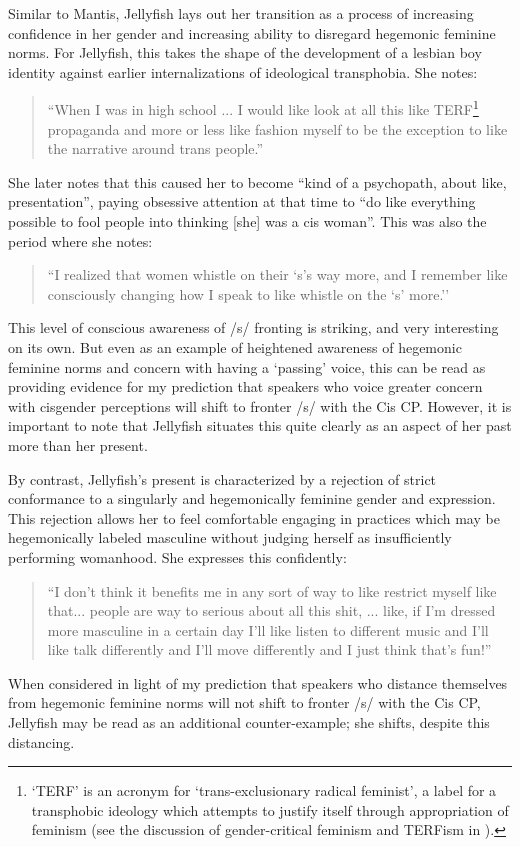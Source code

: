 \documentclass[12pt,twoside]{reedthesis}
\begin{document}
Similar to Mantis, Jellyfish lays out her transition as a process of increasing confidence in her gender and increasing ability to disregard hegemonic feminine norms. For Jellyfish, this takes the shape of the development of a lesbian boy identity against earlier internalizations of ideological transphobia. She notes:
\begin{quote}
 ``When I was in high school ... I would like look at all this like TERF\footnote{`TERF' is an acronym for `trans-exclusionary radical feminist', a label for a transphobic ideology which attempts to justify itself through appropriation of feminism (see the discussion of gender-critical feminism and TERFism in \cite{barrett_sexuality_2024}).} propaganda and more or less like fashion myself to be the exception to like the narrative around trans people.''
\end{quote}
She later notes that this caused her to become ``kind of a psychopath, about like, presentation'', paying obsessive attention at that time to ``do like everything possible to fool people into thinking [she] was a cis woman''. This was also the period where she notes:
\begin{quote}
``I realized that women whistle on their `s's way more, and I remember like consciously changing how I speak to like whistle on the `s' more.''
\end{quote}
This level of conscious awareness of /s/ fronting is striking, and very interesting on its own. But even as an example of heightened awareness of hegemonic feminine norms and concern with having a `passing' voice, this can be read as providing evidence for my prediction that speakers who voice greater concern with cisgender perceptions will shift to fronter /s/ with the Cis CP. However, it is important to note that Jellyfish situates this quite clearly as an aspect of her past more than her present.

By contrast, Jellyfish's present is characterized by a rejection of strict conformance to a singularly and hegemonically feminine gender and expression. This rejection allows her to feel comfortable engaging in practices which may be hegemonically labeled masculine without judging herself as insufficiently performing womanhood. She expresses this confidently:
\begin{quote}
``I don't think it benefits me in any sort of way to like restrict myself like that... people are way to serious about all this shit, ... like, if I'm dressed more masculine in a certain day I'll like listen to different music and I'll like talk differently and I'll move differently and I just think that's fun!''
\end{quote}
When considered in light of my prediction that speakers who distance themselves from hegemonic feminine norms will not shift to fronter /s/ with the Cis CP, Jellyfish may be read as an additional counter-example; she shifts, despite this distancing.
\end{document}
